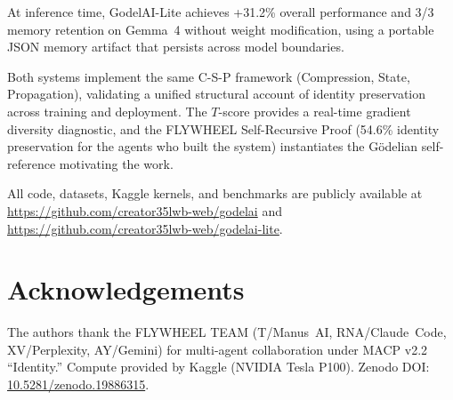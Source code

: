\documentclass[12pt]{article}
\newcommand{\tscore}{$T$\nobreakdash-score\xspace}
\begin{document}
At inference time, GodelAI-Lite achieves +31.2\% overall performance and
3/3 memory retention on Gemma~4 without weight modification, using a portable
JSON memory artifact that persists across model boundaries.

Both systems implement the same C-S-P framework (Compression, State,
Propagation), validating a unified structural account of identity preservation
across training and deployment. The \tscore{} provides a real-time gradient
diversity diagnostic, and the FLYWHEEL Self-Recursive Proof (54.6\% identity
preservation for the agents who built the system) instantiates the G\"{o}delian
self-reference motivating the work.

All code, datasets, Kaggle kernels, and benchmarks are publicly available at
\url{https://github.com/creator35lwb-web/godelai} and
\url{https://github.com/creator35lwb-web/godelai-lite}.

\section*{Acknowledgements}

The authors thank the FLYWHEEL TEAM (T/Manus~AI, RNA/Claude~Code,
XV/Perplexity, AY/Gemini) for multi-agent collaboration under MACP v2.2
``Identity.'' Compute provided by Kaggle (NVIDIA Tesla P100).
Zenodo DOI: \href{https://doi.org/10.5281/zenodo.19886315}{10.5281/zenodo.19886315}.



\end{document}

